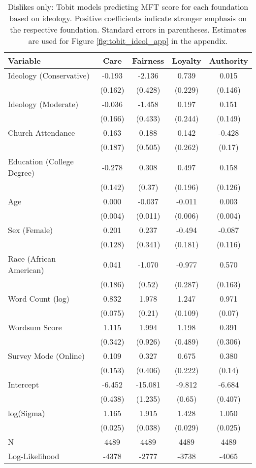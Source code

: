 \begin{table}[ht]
\centering
\caption[Dislikes only: Tobit models predicting MFT score for each foundation based 
           on ideology]{Dislikes only: Tobit models predicting MFT score for each foundation based 
           on ideology. Positive coefficients indicate stronger emphasis on the respective 
           foundation. Standard errors in parentheses. Estimates are used for 
           Figure \ref{fig:tobit_ideol_app} in the appendix.} 
\label{tab:tobit_dislike}
\begingroup\footnotesize
\begin{tabular}{lcccc}
  \hline
Variable & Care & Fairness & Loyalty & Authority \\ 
  \hline
Ideology (Conservative) & -0.193 &  -2.136 &  0.739 &  0.015 \\ 
   & (0.162) & (0.428) & (0.229) & (0.146) \\ 
  Ideology (Moderate) & -0.036 &  -1.458 &  0.197 &  0.151 \\ 
   & (0.166) & (0.433) & (0.244) & (0.149) \\ 
  Church Attendance &  0.163 &   0.188 &  0.142 & -0.428 \\ 
   & (0.187) & (0.505) & (0.262) & (0.17) \\ 
  Education (College Degree) & -0.278 &   0.308 &  0.497 &  0.158 \\ 
   & (0.142) & (0.37) & (0.196) & (0.126) \\ 
  Age &  0.000 &  -0.037 & -0.011 &  0.003 \\ 
   & (0.004) & (0.011) & (0.006) & (0.004) \\ 
  Sex (Female) &  0.201 &   0.237 & -0.494 & -0.087 \\ 
   & (0.128) & (0.341) & (0.181) & (0.116) \\ 
  Race (African American) &  0.041 &  -1.070 & -0.977 &  0.570 \\ 
   & (0.186) & (0.52) & (0.287) & (0.163) \\ 
  Word Count (log) &  0.832 &   1.978 &  1.247 &  0.971 \\ 
   & (0.075) & (0.21) & (0.109) & (0.07) \\ 
  Wordsum Score &  1.115 &   1.994 &  1.198 &  0.391 \\ 
   & (0.342) & (0.926) & (0.489) & (0.306) \\ 
  Survey Mode (Online) &  0.109 &   0.327 &  0.675 &  0.380 \\ 
   & (0.153) & (0.406) & (0.222) & (0.14) \\ 
  Intercept & -6.452 & -15.081 & -9.812 & -6.684 \\ 
   & (0.438) & (1.235) & (0.65) & (0.407) \\ 
  log(Sigma) &  1.165 &   1.915 &  1.428 &  1.050 \\ 
   & (0.025) & (0.038) & (0.029) & (0.025) \\ 
   \hline
N & 4489 & 4489 & 4489 & 4489 \\ 
  Log-Likelihood & -4378 & -2777 & -3738 & -4065 \\ 
   \hline
\end{tabular}
\endgroup
\end{table}
